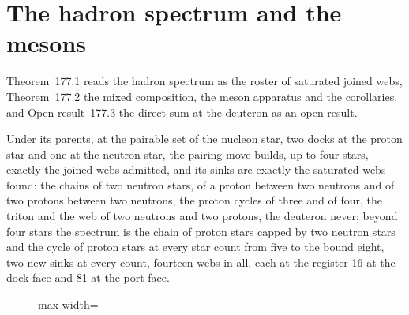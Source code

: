 \section{The hadron spectrum and the mesons}\label{mod:VII-6-hadron-spectrum-and-the-mesons}
\label{narr:open:7-6}Theorem~177.1 reads the hadron spectrum as the roster of saturated joined webs, Theorem~177.2 the mixed composition, the meson apparatus and the corollaries, and Open result~177.3 the direct sum at the deuteron as an open result.
\begin{chconditional}\label{box:VII-6-hadron-spectrum-and-the-mesons:1}
Under its parents, at the pairable set of the nucleon star, two docks at the proton star and one at the neutron star, the pairing move builds, up to four stars, exactly the joined webs admitted, and its sinks are exactly the saturated webs found: the chains of two neutron stars, of a proton between two neutrons and of two protons between two neutrons, the proton cycles of three and of four, the triton and the web of two neutrons and two protons, the deuteron never; beyond four stars the spectrum is the chain of proton stars capped by two neutron stars and the cycle of proton stars at every star count from five to the bound eight, two new sinks at every count, fourteen webs in all, each at the register 16 at the dock face and 81 at the port face.
\begin{figure}[H]\centering
\begin{adjustbox}{max width=\linewidth}
\end{adjustbox}
\end{figure}
\end{chconditional}

